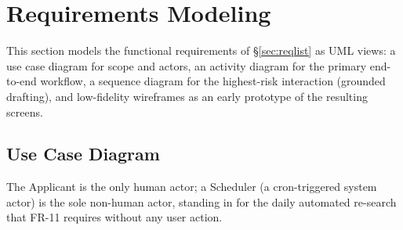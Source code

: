 \documentclass[11pt,a4paper]{article}
\begin{document}
\section{Requirements Modeling}
This section models the functional requirements of \S\ref{sec:reqlist} as UML views: a use
case diagram for scope and actors, an activity diagram for the primary end-to-end workflow, a
sequence diagram for the highest-risk interaction (grounded drafting), and low-fidelity
wireframes as an early prototype of the resulting screens.

\subsection{Use Case Diagram}
The Applicant is the only human actor; a Scheduler (a cron-triggered system actor) is the
sole non-human actor, standing in for the daily automated re-search that FR-11 requires
without any user action.

\newcommand{\stickfig}[2]{%
  \begin{scope}[shift={#1}]
    \draw[darkblue!75,line width=0.7pt] (0,1.05) circle (0.17);
    \draw[darkblue!75,line width=0.7pt] (0,0.88) -- (0,0.25);
    \draw[darkblue!75,line width=0.7pt] (-0.32,0.72) -- (0,0.88) -- (0.32,0.72);
    \draw[darkblue!75,line width=0.7pt] (-0.28,-0.15) -- (0,0.25) -- (0.28,-0.15);
    \node[font=\scriptsize\bfseries,darkblue,align=center] at (0,-0.45) {#2};
  \end{scope}
}
\end{document}
